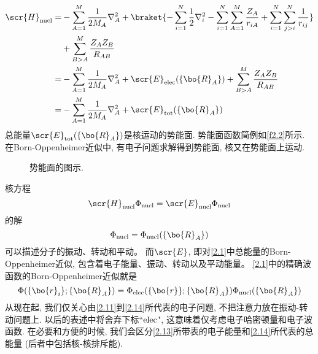 \begin{equation}
\begin{split}
\scr{H}_{\rm nucl}= &- \sum_{A=1}^{M}\frac{1}{2M_A}\nabla_A^2 + \braket{-\sum_{i=1}^{N}\frac{1}{2}\nabla_i^2 - \sum_{i=1}^{N}\sum_{A=1}^{M}\frac{Z_A}{r_{iA}} + \sum_{i=1}^{N}\sum_{j>i}^{N}\frac{1}{r_{ij}}}\\
& + \sum_{B>A}^M\frac{Z_AZ_B}{R_{AB}}\\
= & - \sum_{A=1}^{M}\frac{1}{2M_A}\nabla_A^2 + \scr{E}_{\rm elec}(\{\bo{R}_A\}) + \sum_{B>A}^M\frac{Z_AZ_B}{R_{AB}}\\
= & - \sum_{A=1}^{M}\frac{1}{2M_A}\nabla_A^2 + \scr{E}_{\rm tot}(\{\bo{R}_A\})
\end{split}
\end{equation}
总能量$ \scr{E}_{\rm tot}(\{\bo{R}_A\}) $是核运动的势能面. 
势能面函数简例如\autoref{f2.2}所示. 
在Born-Oppenheimer近似中, 
有电子问题求解得到势能面, 
核又在势能面上运动. 

\begin{figure}[H]
	\def\FunctionA(#1){180*((0.6/(#1+.5))^(12) -(0.6/(#1+ .5))^(6)) + 60}
	\def\FunctionF(#1){(#1)^3- 3*(#1)}
	\caption{势能面的图示.}
	\label{f2.2}
\end{figure}
核\sch 方程
\begin{equation}
\scr{H}_{\rm nucl}\Phi_{\rm nucl} = \scr{E}_{\rm nucl}\Phi_{\rm nucl}
\end{equation}的解
\begin{equation}
\Phi_{\rm nucl}=\Phi_{\rm nucl}(\{\bo{R}_A\})
\end{equation}
可以描述分子的振动、转动和平动。
而$\scr{E}$, 
即对\autoref{2.1}中总能量的Born-Oppenheimer近似,
包含着电子能量、振动、转动以及平动能量。
\autoref{2.1}中的精确波函数的Born-Oppenheimer近似就是
\begin{equation}
\Phi(\{\bo{r}_i\};\{\bo{R}_A\}) = \Phi_{\rm elec}(\{\bo{r}\};\{\bo{R}_A\})\Phi_{\rm nucl}(\{\bo{R}_A\})
\end{equation}
从现在起,
我们仅关心由\autoref{2.11}到\autoref{2.14}所代表的电子问题, 
不把注意力放在振动-转动问题上.
以后的表述中将舍弃下标``$\rm elec$", 
 这意味着仅考虑电子哈密顿量和电子波函数. 
在必要和方便的时候, 
我们会区分\autoref{2.13}所带表的电子能量和\autoref{2.14}所代表的总能量 (后者中包括核-核排斥能).


